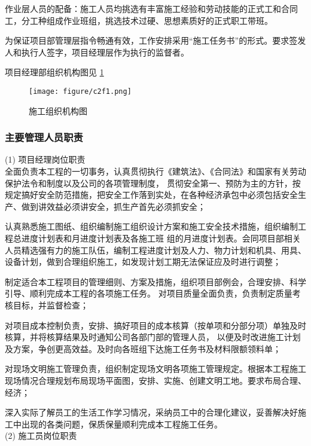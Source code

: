 作业层人员的配备：施工人员均挑选有丰富施工经验和劳动技能的正式工和合同工，分工种组成作业班组，挑选技术过硬、思想素质好的正式职工带班。

为保证项目部管理层指令畅通有效，工作安排采用“施工任务书”的形式。要求签发人和执行人签字，项目经理层作为执行的监督者。

项目经理部组织机构图见 \ref{fig:c2f1}

\begin{figure}[thbp!]
    \centering
    \texttt{[image: figure/c2f1.png]}
    \caption{施工组织机构图}
    \label{fig:c2f1}
\end{figure}

\subsubsection{主要管理人员职责}

(1) 项目经理岗位职责\\

 全面负责本工程的一切事务，认真贯彻执行《建筑法》、《合同法》和国家有关劳动保护法令和制度以及公司的各项管理制度，
贯彻安全第一、预防为主的方针，按规定搞好安全防范措施，把安全工作落到实处，在各种经济承包中必须包括安全生产、做到讲效益必须讲安全，抓生产首先必须抓安全；

 认真熟悉施工图纸、组织编制施工组织设计方案和施工安全技术措施，组织编制工程总进度计划表和月进度计划表及各施工班
组的月进度计划表。会同项目部相关人员精选强有力的施工队伍，编制工程进度计划及人力、物力计划和机具、用具、设备计划，做到合理组织施工，如发现计划工期无法保证应及时进行调整；

 制定适合本工程项目的管理细则、方案及措施，组织项目部例会，合理安排、科学引导、顺利完成本工程的各项施工任务。
对项目质量全面负责，负责制定质量考核目标，并监督检查；

 对项目成本控制负责，安排、搞好项目的成本核算（按单项和分部分项）单独及时核算，并将核算结果及时通知公司各部门部的管理人员，
以便及时改进施工计划及方案，争创更高效益。及时向各班组下达施工任务书及材料限额领料单；

 对现场文明施工管理负责，组织制定现场文明各项施工管理规定。根据本工程施工现场情况合理规划布局现场平面图，安排、实施、创建文明工地。要求布局合理、经济；

 深入实际了解员工的生活工作学习情况，采纳员工中的合理化建议，妥善解决好施工中出现的各类问题，保质保量顺利完成本工程施工任务。\\

(2) 施工员岗位职责\\

